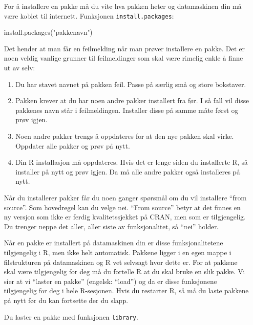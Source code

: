 \documentclass[
  letterpaper,
  DIV=11,
  numbers=noendperiod]{scrreprt}
\newenvironment{Shaded}{\begin{snugshade}}{\end{snugshade}}
\newcommand{\FunctionTok}[1]{\textcolor[rgb]{0.28,0.35,0.67}{#1}}
\newcommand{\NormalTok}[1]{\textcolor[rgb]{0.00,0.23,0.31}{#1}}
\newcommand{\StringTok}[1]{\textcolor[rgb]{0.13,0.47,0.30}{#1}}
\providecommand{\tightlist}{%
  \setlength{\itemsep}{0pt}\setlength{\parskip}{0pt}}\usepackage{longtable,booktabs,array}
\theoremstyle{definition}
\theoremstyle{remark}
\begin{document}
For å installere en pakke må du vite hva pakken heter og datamaskinen
din må være koblet til internett. Funksjonen \texttt{install.packages}:

\begin{Shaded}
\begin{Highlighting}[]
\FunctionTok{install.packages}\NormalTok{(}\StringTok{"pakkenavn"}\NormalTok{)}
\end{Highlighting}
\end{Shaded}

Det hender at man får en feilmelding når man prøver installere en pakke.
Det er noen veldig vanlige grunner til feilmeldinger som skal være
rimelig enkle å finne ut av selv:

\begin{enumerate}
\def\labelenumi{\arabic{enumi})}
\tightlist
\item
  Du har stavet navnet på pakken feil. Passe på særlig små og store
  bokstaver.
\item
  Pakken krever at du har noen andre pakker installert fra før. I så
  fall vil disse pakkenes navn står i feilmeldingen. Installer disse på
  samme måte først og prøv igjen.
\item
  Noen andre pakker trengs å oppdateres for at den nye pakken skal
  virke. Oppdater alle pakker og prøv på nytt.
\item
  Din R installasjon må oppdateres. Hvis det er lenge siden du
  installerte R, så installer på nytt og prøv igjen. Da må alle andre
  pakker også installeres på nytt.
\end{enumerate}

Når du installerer pakker får du noen ganger spørsmål om du vil
installere ``from source''. Som hovedregel kan du velge nei. ``From
source'' betyr at det finnes en ny versjon som ikke er ferdig
kvalitetssjekket på CRAN, men som er tilgjengelig. Du trenger neppe det
aller, aller siste av funksjonalitet, så ``nei'' holder.

Når en pakke er installert på datamaskinen din er disse
funksjonalitetene tilgjengelig i R, men ikke helt automatisk. Pakkene
ligger i en egen mappe i filstrukturen på datamaskinen og R vet selvsagt
hvor dette er. For at pakkene skal være tilgjengelig for deg må du
fortelle R at du skal bruke en slik pakke. Vi sier at vi ``laster en
pakke'' (engelsk: ``load'') og da er disse funksjonene tilgjengelig for
deg i hele R-sesjonen. Hvis du restarter R, så må du laste pakkene på
nytt før du kan fortsette der du slapp.

Du laster en pakke med funksjonen \texttt{library}.
\end{document}
